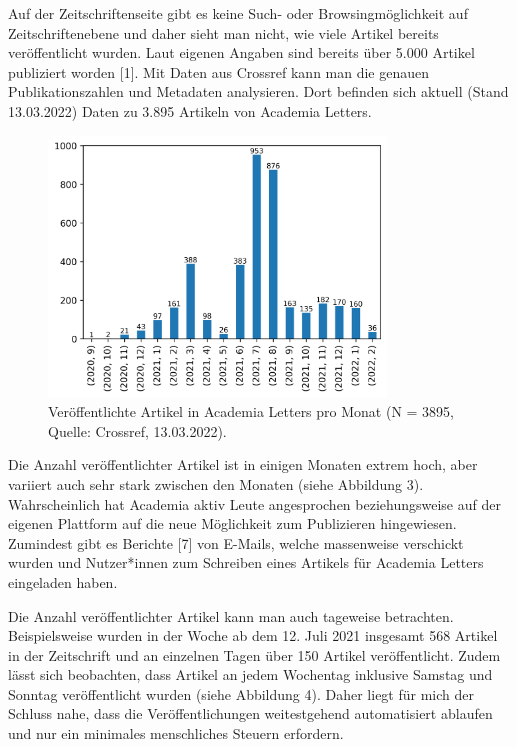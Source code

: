 \documentclass[a4paper,
fontsize=11pt,
oneside,
numbers=noperiodatend,
parskip=half-,
bibliography=totoc,
final
]{scrartcl}
\begin{document}
Auf der Zeitschriftenseite gibt es keine Such- oder Browsingmöglichkeit
auf Zeitschriftenebene und daher sieht man nicht, wie viele Artikel
bereits veröffentlicht wurden. Laut eigenen Angaben sind bereits über
5.000 Artikel publiziert worden {[}1{]}. Mit Daten aus Crossref kann man
die genauen Publikationszahlen und Metadaten analysieren. Dort befinden
sich aktuell (Stand 13.03.2022) Daten zu 3.895 Artikeln von Academia
Letters.

\begin{figure}
\centering
\includegraphics[width=0.8\textwidth]{img/abb3.png}
\caption{Veröffentlichte Artikel in Academia Letters pro Monat (N =
3895, Quelle: Crossref, 13.03.2022).}
\end{figure}

Die Anzahl veröffentlichter Artikel ist in einigen Monaten extrem hoch,
aber variiert auch sehr stark zwischen den Monaten (siehe Abbildung 3).
Wahrscheinlich hat Academia aktiv Leute angesprochen beziehungsweise auf
der eigenen Plattform auf die neue Möglichkeit zum Publizieren
hingewiesen. Zumindest gibt es Berichte {[}7{]} von E-Mails, welche
massenweise verschickt wurden und Nutzer*innen zum Schreiben eines
Artikels für Academia Letters eingeladen haben.

Die Anzahl veröffentlichter Artikel kann man auch tageweise betrachten.
Beispielsweise wurden in der Woche ab dem 12. Juli 2021 insgesamt 568
Artikel in der Zeitschrift und an einzelnen Tagen über 150 Artikel
veröffentlicht. Zudem lässt sich beobachten, dass Artikel an jedem
Wochentag inklusive Samstag und Sonntag veröffentlicht wurden (siehe
Abbildung 4). Daher liegt für mich der Schluss nahe, dass die
Veröffentlichungen weitestgehend automatisiert ablaufen und nur ein
minimales menschliches Steuern erfordern.
\end{document}
